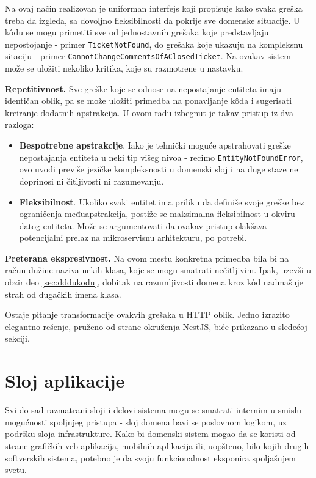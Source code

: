 \documentclass[12pt,oneside]{memoir}
\begin{document}
Na ovaj način realizovan je uniforman interfejs koji propisuje kako svaka greška treba da izgleda, sa dovoljno fleksibilnosti da pokrije sve domenske situacije. U k\^{o}du se mogu primetiti sve od jednostavnih grešaka koje predstavljaju nepostojanje - primer \verb|TicketNotFound|, do grešaka koje ukazuju na kompleksnu sitaciju - primer \verb|CannotChangeCommentsOfAClosedTicket|. Na ovakav sistem može se uložiti nekoliko kritika, koje su razmotrene u nastavku.

\textbf{Repetitivnost.}  
Sve greške koje se odnose na nepostajanje entiteta imaju identičan oblik, pa se može uložiti primedba na ponavljanje k\^{o}da i sugerisati kreiranje dodatnih apstrakcija. U ovom radu izbegnut je takav pristup iz dva razloga:
\begin{itemize}
    \item \textbf{Bespotrebne apstrakcije}. Iako je tehnički moguće apstrahovati greške nepostajanja entiteta u neki tip višeg nivoa - recimo \verb|EntityNotFoundError|, ovo uvodi previše jezičke kompleksnosti u domenski sloj i na duge staze ne doprinosi ni čitljivosti ni razumevanju.
    \item \textbf{Fleksibilnost}. Ukoliko svaki entitet ima priliku da definiše svoje greške bez ograničenja međuapstrakcija, postiže se maksimalna fleksibilnost u okviru datog entiteta. Može se argumentovati da ovakav pristup olakšava potencijalni prelaz na mikroservisnu arhitekturu, po potrebi.
\end{itemize}


\textbf{Preterana ekspresivnost.} Na ovom mestu konkretna primedba bila bi na račun dužine naziva nekih klasa, koje se mogu smatrati nečitljivim. Ipak, uzevši u obzir deo \ref{sec:dddukodu}, dobitak na razumljivosti domena kroz k\^{o}d nadmašuje strah od dugačkih imena klasa.


Ostaje pitanje transformacije ovakvih grešaka u HTTP oblik. Jedno izrazito elegantno rešenje, pruženo od strane okruženja NestJS, biće prikazano u sledećoj sekciji.

\section{Sloj aplikacije}
\label{sec:layer_app}

Svi do sad razmatrani sloji i delovi sistema mogu se smatrati internim u smislu mogućnosti spoljnjeg pristupa - sloj domena bavi se poslovnom logikom, uz podršku sloja infrastrukture. Kako bi domenski sistem mogao da se koristi od strane grafičkih veb aplikacija, mobilnih aplikacija ili, uopšteno, bilo kojih drugih softverskih sistema, potebno je da svoju funkcionalnost eksponira spoljašnjem svetu. 
\end{document}
